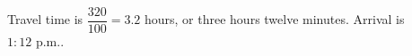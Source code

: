 Travel time is $\dfrac{320}{100}=3.2$ hours, or three hours twelve minutes. Arrival is $\boxed{1{:}12\text{ p.m.}}$.
